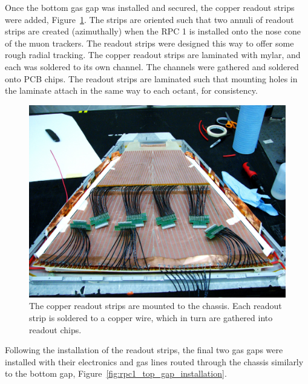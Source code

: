 Once the bottom gas gap was installed and secured, the copper readout strips
were added, Figure~\ref{fig:rpc1_construction_5}. The strips are oriented such
that two annuli of readout strips are created (azimuthally) when the RPC 1 is
installed onto the nose cone of the muon trackers. The readout strips were
designed this way to offer some rough radial tracking. The copper readout strips
are laminated with mylar, and each was soldered to its own channel. The channels
were gathered and soldered onto PCB chips. The readout strips are laminated such
that mounting holes in the laminate attach in the same way to each octant, for
consistency.

\begin{figure}
  \centering
  \includegraphics[width=0.7\linewidth]{./figures/rpc1_construction_5}
  \caption{
    The copper readout strips are mounted to the chassis. Each readout strip is
    soldered to a copper wire, which in turn are gathered into readout chips.
  }
  \label{fig:rpc1_construction_5}
\end{figure}

Following the installation of the readout strips, the final two gas gaps were
installed with their electronics and gas lines routed through the chassis
similarly to the bottom gap, Figure~\ref{fig:rpc1_top_gap_installation}. 

